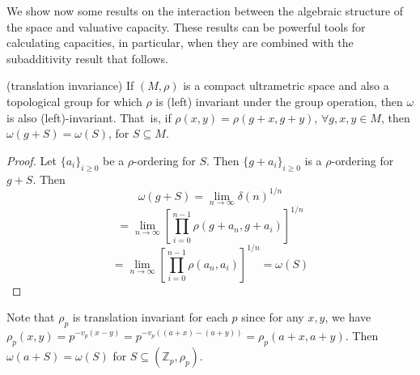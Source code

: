 

We show now some results on the interaction between the algebraic structure of the space and valuative capacity. These results can be powerful tools for calculating capacities, in particular, when they are combined with the subadditivity result that follows.\\
 
\begin{proposition}
\label{translation invariance}
	(translation invariance) If $(M, \rho)$ is a compact ultrametric space and also a topological group for which $\rho$ is (left) invariant under the group operation, then $\omega$ is also (left)-invariant. That\ is, if $\rho(x,y)=\rho(g+x,g+y)$, $ \forall g,x,y \in M$, then $\omega(g+S)=\omega(S)$, for $S \subseteq M$.	
\end{proposition}

\begin{proof}
	Let $\{a_i\}_{i\geq 0}$ be a $\rho$-ordering for $S$. Then $\{g+a_i\}_{i\geq 0}$ is a $\rho$-ordering for $g+S$. Then \[\omega(g+S) = \lim_{n\to\infty} \delta(n)^{1/n} \]
	\[ = \lim_{n\to\infty} [\prod_{i=0}^{n-1} \rho(g+a_n,g+a_i)]^{1/n} \]
	\[=\lim_{n\to\infty} [\prod_{i=0}^{n-1} \rho(a_n,a_i)]^{1/n}	 = \omega(S) \]
\end{proof}	

\begin{example}
	Note that $\rho_p$ is translation invariant for each $p$ since for any $x,y$, we have $\rho_p(x,y) = p^{-v_p(x-y)} = p^{-v_p((a+x)-(a+y))} = \rho_p(a+x,a+y)$. Then $\omega(a+S) = \omega(S)$ for $S \subseteq (\mathbb{Z}_p, \rho_p)$.
\end{example}

